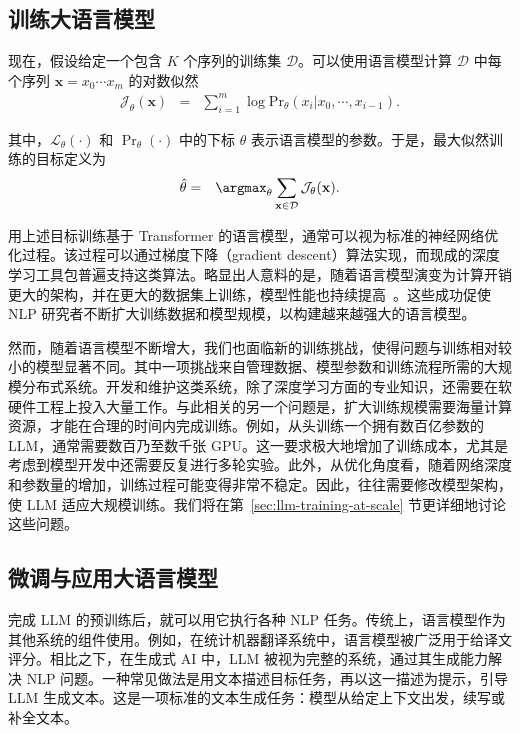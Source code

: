 \subsection{训练大语言模型}

\noindent 现在，假设给定一个包含 $K$ 个序列的训练集 $\mathcal{D}$。可以使用语言模型计算 $\mathcal{D}$ 中每个序列 $\mathbf{x} = x_0 \cdots x_m$ 的对数似然
\begin{eqnarray}
\mathcal{J}_{\theta}(\mathbf{x}) & = & \sum_{i=1}^{m} \log \mathrm{Pr}_{\theta}(x_i|x_0,\cdots,x_{i-1}) \label{eq:llm-training-loss-likelihood}.
\end{eqnarray}

\noindent 其中，$\mathcal{L}_{\theta}(\cdot)$ 和 $\Pr_{\theta}(\cdot)$ 中的下标 $\theta$ 表示语言模型的参数。于是，最大似然训练的目标定义为
\begin{eqnarray}
\hat{\theta} & = & \argmax_{\theta} \sum_{\mathbf{x} \in \mathcal{D}} \mathcal{J}_{\theta}(\mathbf{x}) \label{eq:llm-training-mle}.
\end{eqnarray}

用上述目标训练基于 Transformer 的语言模型，通常可以视为标准的神经网络优化过程。该过程可以通过梯度下降（gradient descent）算法实现，而现成的深度学习工具包普遍支持这类算法。略显出人意料的是，随着语言模型演变为计算开销更大的架构，并在更大的数据集上训练，模型性能也持续提高~\cite{kaplan-etal:2020scaling}。这些成功促使 NLP 研究者不断扩大训练数据和模型规模，以构建越来越强大的语言模型。

然而，随着语言模型不断增大，我们也面临新的训练挑战，使得问题与训练相对较小的模型显著不同。其中一项挑战来自管理数据、模型参数和训练流程所需的大规模分布式系统。开发和维护这类系统，除了深度学习方面的专业知识，还需要在软硬件工程上投入大量工作。与此相关的另一个问题是，扩大训练规模需要海量计算资源，才能在合理的时间内完成训练。例如，从头训练一个拥有数百亿参数的 LLM，通常需要数百乃至数千张 GPU。这一要求极大地增加了训练成本，尤其是考虑到模型开发中还需要反复进行多轮实验。此外，从优化角度看，随着网络深度和参数量的增加，训练过程可能变得非常不稳定。因此，往往需要修改模型架构，使 LLM 适应大规模训练。我们将在第~\ref{sec:llm-training-at-scale} 节更详细地讨论这些问题。

\subsection{微调与应用大语言模型}

\noindent 完成 LLM 的预训练后，就可以用它执行各种 NLP 任务。传统上，语言模型作为其他系统的组件使用。例如，在统计机器翻译系统中，语言模型被广泛用于给译文评分。相比之下，在生成式 AI 中，LLM 被视为完整的系统，通过其生成能力解决 NLP 问题。一种常见做法是用文本描述目标任务，再以这一描述为提示，引导 LLM 生成文本。这是一项标准的文本生成任务：模型从给定上下文出发，续写或补全文本。

